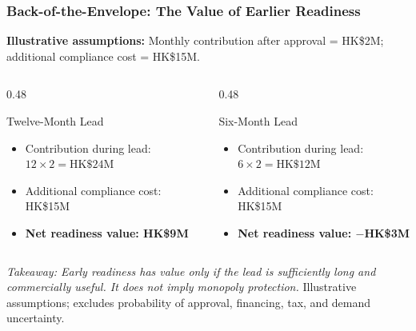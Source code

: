 \documentclass{beamer}
\begin{document}
\begin{frame}[t,shrink=10]
\frametitle{Back-of-the-Envelope: The Value of Earlier Readiness}
\textbf{Illustrative assumptions:} Monthly contribution after approval = HK\$2M; additional compliance cost = HK\$15M.
\begin{columns}[T]
\begin{column}{0.48\textwidth}\begin{block}{Twelve-Month Lead}
\begin{itemize}
\item Contribution during lead: $12\times2=\text{HK\$24M}$
\item Additional compliance cost: HK\$15M
\item \textbf{Net readiness value: HK\$9M}
\end{itemize}\end{block}\end{column}
\begin{column}{0.48\textwidth}\begin{block}{Six-Month Lead}
\begin{itemize}
\item Contribution during lead: $6\times2=\text{HK\$12M}$
\item Additional compliance cost: HK\$15M
\item \textbf{Net readiness value: $-$HK\$3M}
\end{itemize}\end{block}\end{column}
\end{columns}
\textit{Takeaway: Early readiness has value only if the lead is sufficiently long and commercially useful. It does not imply monopoly protection.}
\vfill{\tiny Illustrative assumptions; excludes probability of approval, financing, tax, and demand uncertainty.}
\end{frame}
\end{document}
